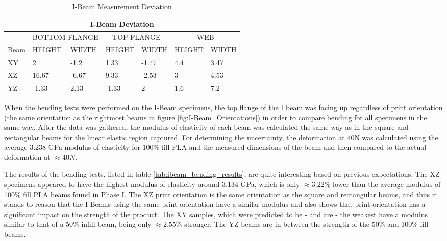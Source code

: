 	\begin{table} [h]
	\centering
		\begin{tabularx}{\textwidth}{| X | X | X | X | X | X | X |}
		\hline
			\multicolumn{7}{|c|}{I-Beam Deviation} \\ \hline
			& \multicolumn{2}{c|}{BOTTOM FLANGE} & \multicolumn{2}{c|}{TOP FLANGE} & \multicolumn{2}{c|}{WEB}\\ \hline
			Beam & HEIGHT & WIDTH & HEIGHT & WIDTH & HEIGHT & WIDTH \\ \hline
			XY & 2 & -1.2 & 1.33 & -1.47 & 4.4 & 3.47 \\ \hline
			XZ & 16.67 & -6.67 & 9.33 & -2.53 & 3 & 4.53 \\ \hline
			YZ & -1.33 & 2.13 & -1.33 & 2 & 1.6 & 7.2 \\ \hline
		\end{tabularx}
		\caption{I-Beam Measurement Deviation}
		\label{tab:ibeam-dev}
	\end{table}
	
	When the bending tests were performed on the I-Beam specimens, the top flange of the I beam was facing up regardless of print orientation (the same orientation as the rightmost beams in figure \ref{fig:I-Beam_Orientations}) in order to compare bending for all specimens in the same way. After the data was gathered, the modulus of elasticity of each beam was calculated the same way as in the square and rectangular beams for the linear elastic region captured. For determining the uncertainty, the deformation at 40N was calculated using the average 3.238 GPa modulus of elasticity for 100\% fill PLA and the measured dimensions of the beam and then compared to the actual deformation at $\approx 40N$. 	
	
	The results of the bending tests, listed in table \ref{tab:ibeam_bending_results}, are quite interesting based on previous expectations. The XZ specimens appeared to have the highest modulus of elasticity around 3.134 GPa, which is only $\approx 3.22\%$ lower than the average modulus of 100\% fill PLA beams found in Phase I. The XZ print orientation is the same orientation as the square and rectangular beams, and thus it stands to reason that the I-Beams using the same print orientation have a similar modulus and also shows that print orientation has a significant impact on the strength of the product. The XY samples, which were predicted to be - and are - the weakest have a modulus similar to that of a 50\% infill beam, being only $\approx 2.55\%$ stronger. The YZ beams are in between the strength of the 50\% and 100\% fill beams.

